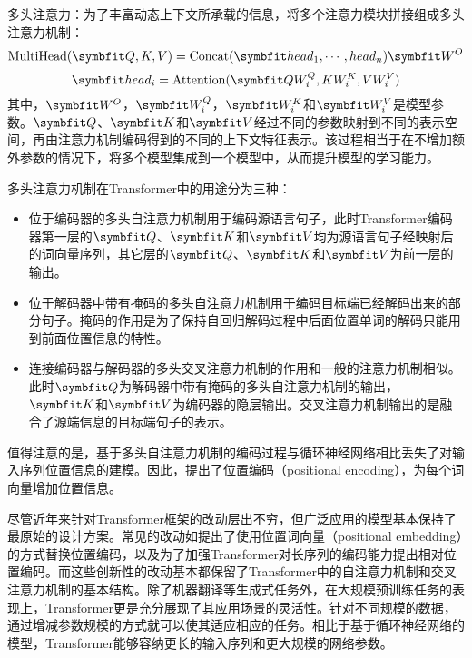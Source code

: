 {\sffamily 多头注意力：}为了丰富动态上下文所承载的信息，将多个注意力模块拼接组成多头注意力机制：
\begin{equation}
    \mathrm{MultiHead}(\Vector{Q,K,V}) = \mathrm{Concat}(\Vector{head_1, \cdots, head_n})\Vector{W^O}
\end{equation}
\begin{equation}
    \Vector{head_i} = \mathrm{Attention}(\Vector{Q W_i^Q,K W_i^K,V W_i^V})
\end{equation}
其中，$\Vector{W^O}$，$\Vector{W_i^Q}$，$\Vector{W_i^K}$和$\Vector{W_i^V}$是模型参数。$\Vector{Q}$、$\Vector{K}$和$\Vector{V}$经过不同的参数映射到不同的表示空间，再由注意力机制编码得到的不同的上下文特征表示。该过程相当于在不增加额外参数的情况下，将多个模型集成到一个模型中，从而提升模型的学习能力。

多头注意力机制在Transformer中的用途分为三种：
\begin{itemize}
    \item 位于编码器的多头自注意力机制用于编码源语言句子，此时Transformer编码器第一层的$\Vector{Q}$、$\Vector{K}$和$\Vector{V}$均为源语言句子经映射后的词向量序列，其它层的$\Vector{Q}$、$\Vector{K}$和$\Vector{V}$为前一层的输出。
    \item 位于解码器中带有掩码的多头自注意力机制用于编码目标端已经解码出来的部分句子。掩码的作用是为了保持自回归解码过程中后面位置单词的解码只能用到前面位置信息的特性。
    \item 连接编码器与解码器的多头交叉注意力机制的作用和一般的注意力机制相似。此时$\Vector{Q}$为解码器中带有掩码的多头自注意力机制的输出，$\Vector{K}$和$\Vector{V}$为编码器的隐层输出。交叉注意力机制输出的是融合了源端信息的目标端句子的表示。
\end{itemize}

值得注意的是，基于多头自注意力机制的编码过程与循环神经网络相比丢失了对输入序列位置信息的建模。因此，提出了位置编码（positional encoding），为每个词向量增加位置信息。%

尽管近年来针对Transformer框架的改动层出不穷，但广泛应用的模型基本保持了最原始的设计方案。常见的改动如提出了使用位置词向量（positional embedding）的方式替换位置编码，以及为了加强Transformer对长序列的编码能力提出相对位置编码。而这些创新性的改动基本都保留了Transformer中的自注意力机制和交叉注意力机制的基本结构。除了机器翻译等生成式任务外，在大规模预训练任务的表现上，Transformer更是充分展现了其应用场景的灵活性\citep{radfordimproving,devlin2019bert,liu2019roberta,lewis2020bart,raffel2020exploring}。针对不同规模的数据，通过增减参数规模的方式就可以使其适应相应的任务。相比于基于循环神经网络的模型，Transformer能够容纳更长的输入序列和更大规模的网络参数。

